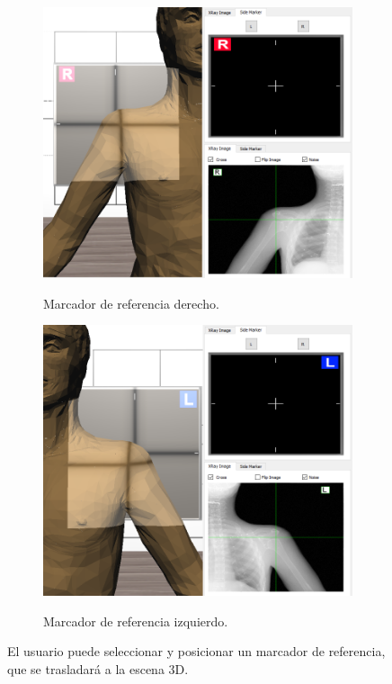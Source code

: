 \begin{figure}[h]
    \begin{subfigure}[b]{0.45\linewidth}
        \centering
        {\includegraphics[width=\linewidth]{IMG/Rside.png}}
        \caption{Marcador de referencia derecho.}
    \end{subfigure}
    \null\hfill
     \begin{subfigure}[b]{0.45\linewidth}
        \centering
        {\includegraphics[width=\linewidth]{IMG/Lside.png}}
        \caption{Marcador de referencia izquierdo.}
    \end{subfigure}
    \caption{\label{fig:side} El usuario puede seleccionar y posicionar un marcador de referencia, que se trasladará a la escena 3D.}
   \end{figure}




